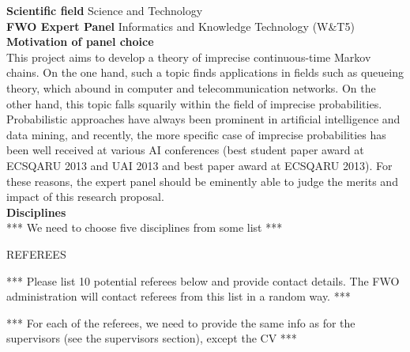 \documentclass[11pt,dvipsnames,usenames,a4paper]{article}
\begin{document}
{\bf Scientific field} \tab Science and Technology \\
{\bf FWO Expert Panel} \tab Informatics and Knowledge Technology (W\&T5) \\[8pt]
{\bf Motivation of panel choice}\\[6pt]
This project aims to develop a theory of imprecise continuous-time Markov chains. On the one hand, such a topic finds applications in fields such as queueing theory, which abound in computer and telecommunication networks. On the other hand, this topic falls squarily within the field of imprecise probabilities. Probabilistic approaches have always been prominent in artificial intelligence and data mining, and recently, the more specific case of imprecise probabilities has been well received at various AI conferences (best student paper award at ECSQARU 2013 and UAI 2013 and best paper award at ECSQARU 2013). For these reasons, the expert panel should be eminently able to judge the merits and impact of this research proposal.\\[8pt]
{\bf Disciplines}\\[6pt]
*** We need to choose five disciplines from some list ***


\vspace{5mm}

\begin{shaded}\centering REFEREES \end{shaded}


*** Please list 10 potential referees below and provide contact details.
The FWO administration will contact referees from this list in a random way. ***

*** For each of the referees, we need to provide the same info as for the supervisors (see the supervisors section), except the CV ***
\end{document}
